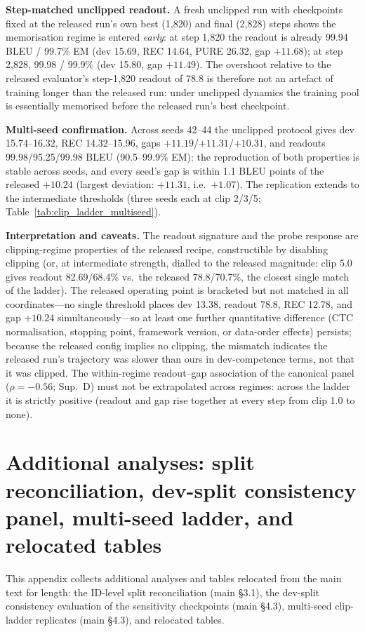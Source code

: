 \documentclass[pdflatex,sn-chicago]{sn-jnl}
\begin{document}
\textbf{Step-matched unclipped readout.} A fresh unclipped run with checkpoints fixed at the released run's own best (1{,}820) and final (2{,}828) steps shows the memorisation regime is entered \emph{early}: at step 1{,}820 the readout is already 99.94 BLEU / 99.7\% EM (dev 15.69, REC 14.64, PURE 26.32, gap $+11.68$); at step 2{,}828, 99.98 / 99.9\% (dev 15.80, gap $+11.49$). The overshoot relative to the released evaluator's step-1{,}820 readout of 78.8 is therefore not an artefact of training longer than the released run: under unclipped dynamics the training pool is essentially memorised before the released run's best checkpoint.

\textbf{Multi-seed confirmation.} Across seeds 42--44 the unclipped protocol gives dev 15.74--16.32, REC 14.32--15.96, gaps $+11.19$/$+11.31$/$+10.31$, and readouts 99.98/95.25/99.98 BLEU (90.5--99.9\% EM): the reproduction of both properties is stable across seeds, and every seed's gap is within 1.1 BLEU points of the released $+10.24$ (largest deviation: $+11.31$, i.e.\ $+1.07$). The replication extends to the intermediate thresholds (three seeds each at clip 2/3/5; Table~\ref{tab:clip_ladder_multiseed}).

\textbf{Interpretation and caveats.} The readout signature and the probe response are clipping-regime properties of the released recipe, constructible by disabling clipping (or, at intermediate strength, dialled to the released magnitude: clip 5.0 gives readout 82.69/68.4\% vs.\ the released 78.8/70.7\%, the closest single match of the ladder). The released operating point is bracketed but not matched in all coordinates---no single threshold places dev 13.38, readout 78.8, REC 12.78, and gap $+10.24$ simultaneously---so at least one further quantitative difference (CTC normalisation, stopping point, framework version, or data-order effects) persists; because the released config implies no clipping, the mismatch indicates the released run's trajectory was slower than ours in dev-competence terms, not that it was clipped. The within-regime readout--gap association of the canonical panel ($\rho{=}{-}0.56$; Sup.~D) must not be extrapolated across regimes: across the ladder it is strictly positive (readout and gap rise together at every step from clip 1.0 to none).

\section{Additional analyses: split reconciliation, dev-split consistency panel, multi-seed ladder, and relocated tables}
\label{sec:appendix_round34}
This appendix collects additional analyses and tables relocated from the main text for length: the ID-level split reconciliation (main \S3.1), the dev-split consistency evaluation of the sensitivity checkpoints (main \S4.3), multi-seed clip-ladder replicates (main \S4.3), and relocated tables.
\end{document}
